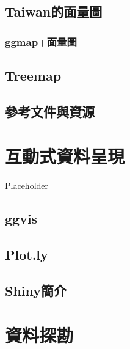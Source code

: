 \documentclass[]{book}
\begin{document}
\hypertarget{taiwanux7684ux9762ux91cfux5716}{%
\section{Taiwan的面量圖}\label{taiwanux7684ux9762ux91cfux5716}}

\hypertarget{ggmapux9762ux91cfux5716}{%
\subsection{ggmap+面量圖}\label{ggmapux9762ux91cfux5716}}

\hypertarget{treemap}{%
\section{Treemap}\label{treemap}}

\hypertarget{ux53c3ux8003ux6587ux4ef6ux8207ux8cc7ux6e90-2}{%
\section{參考文件與資源}\label{ux53c3ux8003ux6587ux4ef6ux8207ux8cc7ux6e90-2}}

\hypertarget{InteractiveGraphics}{%
\chapter{互動式資料呈現}\label{InteractiveGraphics}}

Placeholder

\hypertarget{ggvis}{%
\section{ggvis}\label{ggvis}}

\hypertarget{plot.ly}{%
\section{Plot.ly}\label{plot.ly}}

\hypertarget{shinyux7c21ux4ecb}{%
\section{Shiny簡介}\label{shinyux7c21ux4ecb}}

\hypertarget{datamining}{%
\chapter{資料探勘}\label{datamining}}
\end{document}
